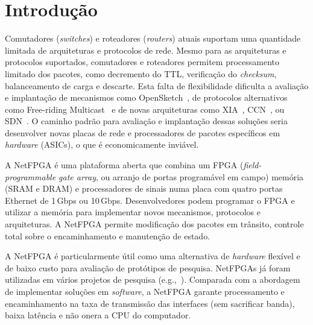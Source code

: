 \newpage
\section{Introdução}

Comutadores (\emph{switches}) e roteadores (\emph{routers}) atuais
suportam uma quantidade limitada de arquiteturas e protocolos de
rede.  Mesmo para as arquiteturas e protocolos suportados,
comutadores e roteadores permitem processamento limitado dos
pacotes, como decremento do TTL, verificação do \emph{checksum},
balanceamento de carga e descarte.  Esta falta de flexibilidade
dificulta a avaliação e implantação de mecanismos como
OpenSketch~\cite{yu13opensketch}, de protocolos alternativos como
Free-riding Multicast~\cite{ratnasamy06multicast} e de novas
arquiteturas como XIA~\cite{han12xia}, CCN~\cite{jacobson09content},
ou SDN~\cite{casado09ethane}.  O caminho padrão para avaliação e
implantação dessas soluções seria desenvolver novas placas de rede e
processadores de pacotes específicos em \emph{hardware} (ASICs), o
que é economicamente inviável.

A NetFPGA é uma plataforma aberta que combina um FPGA
(\emph{field-programmable gate array}, ou arranjo de portas
programável em campo) memória (SRAM e DRAM) e processadores de
sinais numa placa com quatro portas Ethernet de 1\,Gbps ou 10\,Gbps.
Desenvolvedores podem programar o FPGA e utilizar a memória para
implementar novos mecanismos, protocolos e arquiteturas.  A NetFPGA
permite modificação dos pacotes em trânsito, controle total sobre o
encaminhamento e manutenção de estado.

A NetFPGA é particularmente útil como uma alternativa de
\emph{hardware} flexível e de baixo custo para avaliação de
protótipos de pesquisa.  NetFPGAs já foram utilizadas em vários
projetos de pesquisa (e.g.,~\cite{yu13opensketch,
Naous:2008:IOS:1477942.1477944, ghani10secure, thinh12fpga,
antichi12open, lombardo12netfpga}).  Comparada com a abordagem de
implementar soluções em \emph{software}, a NetFPGA garante
processamento e encaminhamento na taxa de transmissão das interfaces
(sem sacrificar banda), baixa latência e não onera a CPU do
computador.


